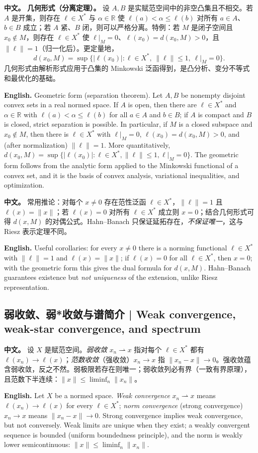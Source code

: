 \documentclass[UTF8,11pt,a4paper]{ctexart}
\newcommand{\APS}[2]{\par\noindent\textbf{中文。} #1\par\noindent\textbf{English.} #2\par\smallskip}
\begin{document}
\APS{\textbf{几何形式（分离定理）。} 设 $A,B$ 是实赋范空间中的非空凸集且不相交。若 $A$ 是开集，则存在 $\ell\in X^*$ 与 $\alpha\in\mathbb R$ 使 $\ell(a)<\alpha\le\ell(b)$ 对所有 $a\in A$、$b\in B$ 成立；若 $A$ 紧、$B$ 闭，则可以严格分离。特例：若 $M$ 是闭子空间且 $x_0\notin M$，则存在 $\ell\in X^*$ 使 $\ell|_M=0$、$\ell(x_0)=d(x_0,M)>0$，且 $\|\ell\|=1$（归一化后）。更定量地，
\[
d(x_0,M)=\sup\{|\ell(x_0)|:\ell\in X^*,\ \|\ell\|\le1,\ \ell|_M=0\}.
\]
几何形式由解析形式应用于凸集的 Minkowski 泛函得到，是凸分析、变分不等式和最优化的基础。}{Geometric form (separation theorem). Let $A,B$ be nonempty disjoint convex sets in a real normed space. If $A$ is open, then there are $\ell\in X^*$ and $\alpha\in\mathbb R$ with $\ell(a)<\alpha\le\ell(b)$ for all $a\in A$ and $b\in B$; if $A$ is compact and $B$ is closed, strict separation is possible. In particular, if $M$ is a closed subspace and $x_0\notin M$, then there is $\ell\in X^*$ with $\ell|_M=0$, $\ell(x_0)=d(x_0,M)>0$, and (after normalization) $\|\ell\|=1$. More quantitatively, $d(x_0,M)=\sup\{|\ell(x_0)|:\ell\in X^*,\|\ell\|\le1,\ell|_M=0\}$. The geometric form follows from the analytic form applied to the Minkowski functional of a convex set, and it is the basis of convex analysis, variational inequalities, and optimization.}

\APS{常用推论：对每个 $x\ne0$ 存在范性泛函 $\ell\in X^*$，$\|\ell\|=1$ 且 $\ell(x)=\|x\|$；若 $\ell(x)=0$ 对所有 $\ell\in X^*$ 成立则 $x=0$；结合几何形式可得 $d(x,M)$ 的对偶公式。Hahn--Banach 只保证延拓存在，\emph{不保证唯一}，这与 Riesz 表示定理不同。}{Useful corollaries: for every $x\ne0$ there is a norming functional $\ell\in X^*$ with $\|\ell\|=1$ and $\ell(x)=\|x\|$; if $\ell(x)=0$ for all $\ell\in X^*$, then $x=0$; with the geometric form this gives the dual formula for $d(x,M)$. Hahn--Banach guarantees existence but \emph{not uniqueness} of the extension, unlike Riesz representation.}

\subsection{弱收敛、弱*收敛与谱简介 | Weak convergence, weak-star convergence, and spectrum}
\APS{设 $X$ 是赋范空间。\emph{弱收敛} $x_n\rightharpoonup x$ 指对每个 $\ell\in X^*$ 都有 $\ell(x_n)\to\ell(x)$；\emph{范数收敛}（强收敛）$x_n\to x$ 指 $\|x_n-x\|\to0$。强收敛蕴含弱收敛，反之不然。弱极限若存在则唯一；弱收敛列必有界（一致有界原理），且范数下半连续：$\|x\|\le\liminf_n\|x_n\|$。}{Let $X$ be a normed space. \emph{Weak convergence} $x_n\rightharpoonup x$ means $\ell(x_n)\to\ell(x)$ for every $\ell\in X^*$; \emph{norm convergence} (strong convergence) $x_n\to x$ means $\|x_n-x\|\to0$. Strong convergence implies weak convergence, but not conversely. Weak limits are unique when they exist; a weakly convergent sequence is bounded (uniform boundedness principle), and the norm is weakly lower semicontinuous: $\|x\|\le\liminf_n\|x_n\|$.}
\end{document}
